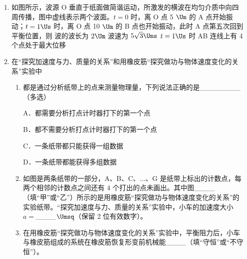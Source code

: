 \documentclass[\gkver]{gaokaozhenti}
\begin{document}
\begin{enumerate}
\item
如图所示，波源 O 垂直于纸面做简谐运动，所激发的横波在均匀介质中向四周传播，图中虚线表示两个波面。$t=0$ 时，离 O 点 5 $\Um$ 的 A 点开始振动；$t=1\Us$ 时，离 O 点 10 $\Um$ 的 B 点也开始振动，此时 A 点第五次回到平衡位置，则
\onepicture[w=3.82cm]{}
{波的波长为 $2\Um$}
{波速为 $5\sqrt 3\Ums$}
{$t=1\Us$ 时 AB 连线上有 4 个点处于最大位移}

\item
在“探究加速度与力、质量的关系”和用橡皮筋“探究做功与物体速度变化的关系”实验中
\begin{enumerate}
	\item
	都是通过分析纸带上的点来测量物理量，下列说法正确的是\_\_\_\_\_\_\_\_（多选）

	A．都需要分析打点计时器打下的第一个点

	B．都不需要分析打点计时器打下的第一个点

	C．一条纸带都只能获得一组数据

	D．一条纸带都能获得多组数据

	\item
	如图是两条纸带的一部分，A、B、C、$\ldots$、G 是纸带上标出的计数点，每两个相邻的计数点之间还有 4 个打出的点未画出。其中图\_\_\_\_（填“甲”或“乙”）所示的是用橡皮筋“探究做功与物体速度变化的关系”的实验纸带。“探究加速度与力、质量的关系”实验中，小车的加速度大小 $a=$\_\_\_\_$\Umsq$（保留 2 位有效数字）。
	\item
	在用橡皮筋“探究做功与物体速度变化的关系”实验中，平衡阻力后，小车与橡皮筋组成的系统在橡皮筋恢复形变前机械能\_\_\_\_（填“守恒”或“不守恒”）。
\end{enumerate}
\end{enumerate}
\end{document}
